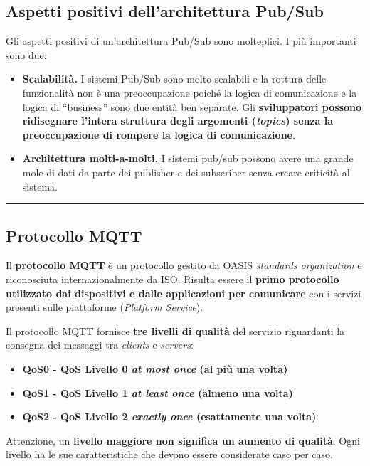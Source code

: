\documentclass[a4paper]{article}
\newcommand{\longline}{\noindent\rule{\textwidth}{0.4pt}}
\newcommand{\dquotes}[1]{``#1''}
\begin{document}
	\newpage
	
	\subsection{Aspetti positivi dell'architettura Pub/Sub}
	
	Gli aspetti positivi di un'architettura Pub/Sub sono molteplici. I più importanti sono due:
	\begin{itemize}
		\item \textcolor{Green4}{\textbf{Scalabilità.}} I sistemi Pub/Sub sono molto scalabili e la rottura delle funzionalità non è una preoccupazione poiché la logica di comunicazione e la logica di \dquotes{business} sono due entità ben separate. Gli \textbf{sviluppatori possono ridisegnare l'intera struttura degli argomenti (\emph{topics}) senza la preoccupazione di rompere la logica di comunicazione}.
		
		\item \textcolor{Green4}{\textbf{Architettura molti-a-molti.}} I sistemi pub/sub possono avere una grande mole di dati da parte dei publisher e dei subscriber senza creare criticità al sistema.
	\end{itemize}
	
	\longline
	
	\subsection{Protocollo MQTT}
	
	Il \textcolor{Red3}{\textbf{protocollo MQTT}} è un protocollo gestito da OASIS \emph{standards organization} e riconosciuta internazionalmente da ISO. Risulta essere il \textbf{primo protocollo utilizzato dai dispositivi e dalle applicazioni per comunicare} con i servizi presenti sulle piattaforme (\emph{Platform Service}).\newline
	
	\noindent
	Il protocollo MQTT fornisce \textbf{tre livelli di qualità} del servizio riguardanti la consegna dei messaggi tra \emph{clients} e \emph{servers}:
	\begin{itemize}
		\item \textbf{QoS0 - QoS Livello 0 \emph{at most once} (al più una volta)}
		
		\item \textbf{QoS1 - QoS Livello 1 \emph{at least once} (almeno una volta)}
		
		\item \textbf{QoS2 - QoS Livello 2 \emph{exactly once} (esattamente una volta)}
	\end{itemize}
	Attenzione, un \textbf{livello maggiore non significa un aumento di qualità}. Ogni livello ha le sue caratteristiche che devono essere considerate caso per caso.\newline
	
\end{document}
